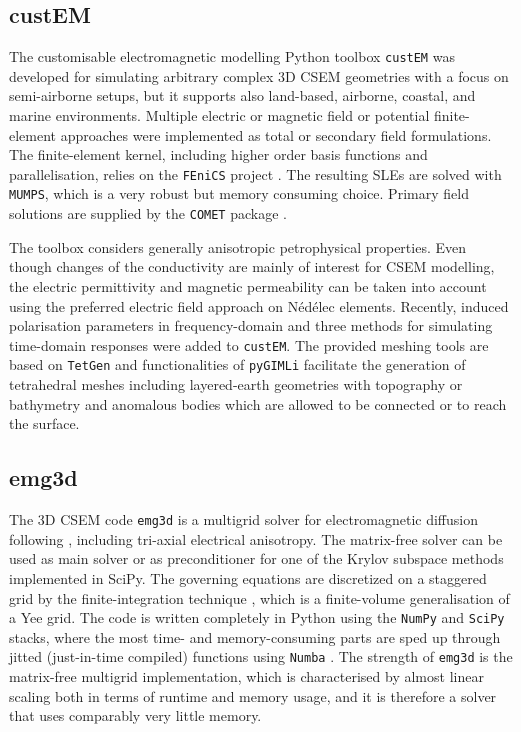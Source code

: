\documentclass[onecolumn,extra,camera]{gji}
\newcommand{\emg}[2]{\texttt{emg#1#2}\xspace}
\newcommand{\custem}{\texttt{custEM}\xspace}
\begin{document}
\subsection{custEM}

The customisable electromagnetic modelling Python toolbox \custem was developed for simulating arbitrary complex 3D CSEM geometries with a focus on semi-airborne setups, but it supports also land-based, airborne, coastal, and marine environments. Multiple electric or magnetic field or potential finite-element approaches were implemented as total or secondary field formulations. The finite-element kernel, including higher order basis functions and parallelisation, relies on the \texttt{FEniCS} project \citep{B.SPR.12.Logg, B.SPR.16.Langtangen}. The resulting SLEs are solved with \texttt{MUMPS}, which is a very robust but memory consuming choice. Primary field solutions are supplied by the \texttt{COMET} package \citep{GEO.20.Skibbe}.

The toolbox considers generally anisotropic petrophysical properties. Even though changes of the conductivity are mainly of interest for CSEM modelling, the electric permittivity and magnetic permeability can be taken into account using the preferred electric field approach on Nédélec elements. Recently, induced polarisation parameters in frequency-domain and three methods for simulating time-domain responses were added to \custem. The provided meshing tools are based on \texttt{TetGen} \citep{TOM.15.Si} and functionalities of \texttt{pyGIMLi} facilitate the generation of tetrahedral meshes including layered-earth geometries with topography or bathymetry and anomalous bodies which are allowed to be connected or to reach the surface.

\subsection{emg3d}

The 3D CSEM code \emg3d is a multigrid solver \citep{CMMP.64.Fedorenko} for electromagnetic diffusion following \cite{GP.06.Mulder}, including tri-axial electrical anisotropy. The matrix-free solver can be used as main solver or as preconditioner for one of the Krylov subspace methods implemented in SciPy. The governing equations are discretized on a staggered grid by the finite-integration technique \citep{AEU.77.Weiland}, which is a finite-volume generalisation of a Yee grid. The code is written completely in Python using the \texttt{NumPy} and \texttt{SciPy} stacks, where the most time- and memory-consuming parts are sped up through jitted (just-in-time compiled) functions using \texttt{Numba} \citep{LLVM.15.Lam}. The strength of \emg3d is the matrix-free multigrid implementation, which is characterised by almost linear scaling both in terms of runtime and memory usage, and it is therefore a solver that uses comparably very little memory.
\end{document}
